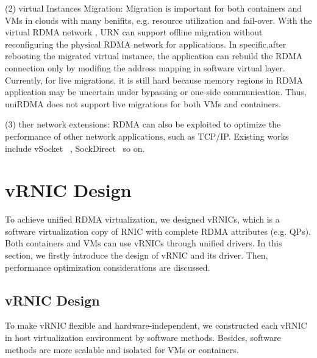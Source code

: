 (2) virtual Instances Migration: Migration is important  for both containers and VMs in clouds with many benifits, e.g. resource utilization and fail-over. With the virtual RDMA network , URN can support offline migration without reconfiguring the physical RDMA network for applications. In specific,after rebooting the migrated virtual instance, the application can rebuild the RDMA connection  only by modifing the address mapping in software virtual layer. Currently, for live migrations, it is still hard because memory regions in RDMA application may be uncertain under bypassing or one-side communication. Thus, uniRDMA does not support live migrations for both VMs and containers.

(3) ther network extensions: RDMA can also be exploited to optimize the performance of other network applications,  such as TCP/IP.  Existing works include vSocket ~\cite{wang2019vsocket}, SockDirect~\cite{li2019socksdirect} so on. 

\section{vRNIC Design}
To achieve unified RDMA virtualization, we designed vRNICs, which is a software virtualization copy of RNIC with complete RDMA attributes (e.g. QPs). Both containers and VMs can use vRNICs through unified drivers. In this section, we firstly introduce the design of vRNIC and its driver. Then, performance optimization considerations are discussed.

\subsection{vRNIC Design}
To make vRNIC flexible and hardware-independent, we constructed each vRNIC in host virtualization environment by software methods. Besides, software methods are more scalable and isolated for VMs or containers.

